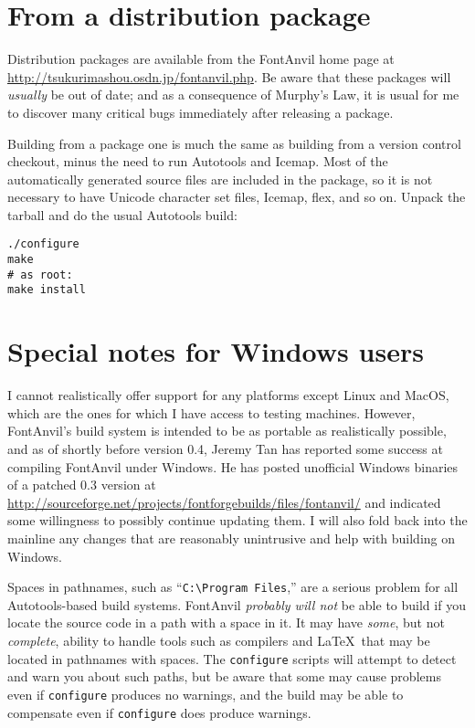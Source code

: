 \section{From a distribution package}

Distribution packages are available from the FontAnvil home page at
\url{http://tsukurimashou.osdn.jp/fontanvil.php}.  Be aware that these
packages will \emph{usually} be out of date; and as a consequence of
Murphy's Law, it is usual for me to discover many critical bugs immediately
after releasing a package.

Building from a package one is much the same as building from a version
control checkout, minus the need to run Autotools and Icemap.  Most of the
automatically generated source files are included in the package, so it is
not necessary to have Unicode character set files, Icemap, flex, and so on.
Unpack the tarball and do the usual Autotools build:

\begin{verbatim}
./configure
make
# as root:
make install
\end{verbatim}

\section{Special notes for Windows users}

I cannot realistically offer support for any platforms except Linux and
MacOS, which are the ones for which I have access to testing machines. 
However, FontAnvil's build system is intended to be as portable as
realistically possible, and as of shortly before version 0.4, Jeremy Tan has
reported some success at compiling FontAnvil under Windows.  He has posted
unofficial Windows binaries of a patched 0.3 version at
\url{http://sourceforge.net/projects/fontforgebuilds/files/fontanvil/} and
indicated some willingness to possibly continue updating them.  I will also
fold back into the mainline any changes that are reasonably unintrusive and
help with building on Windows.

Spaces in pathnames, such as ``\texttt{C:\textbackslash{}Program
Files},'' are a serious problem for all Autotools-based build systems. 
FontAnvil \emph{probably will not} be able to build if you locate the source
code in a path with a space in it.  It may have \emph{some}, but not
\emph{complete}, ability to handle tools such as compilers and \LaTeX\ that
may be located in pathnames with spaces.  The \texttt{configure} scripts
will attempt to detect and warn you about such paths, but be aware that some
may cause problems even if \texttt{configure} produces no warnings, and the
build may be able to compensate even if \texttt{configure} does produce
warnings.

